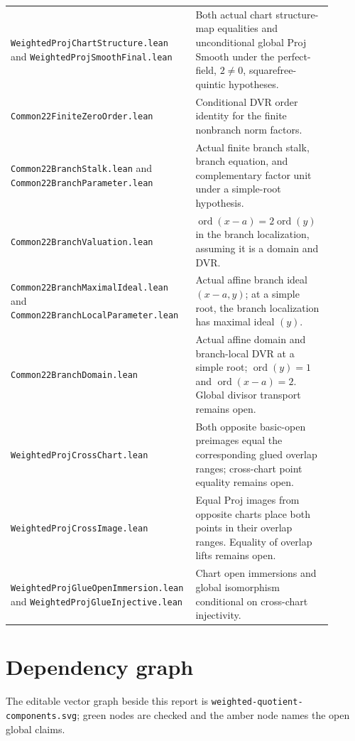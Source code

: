 \documentclass[10pt]{article}
\begin{document}
\begin{longtable}{p{0.48\linewidth}p{0.42\linewidth}}
\texttt{WeightedProjChartStructure.lean} and \texttt{WeightedProjSmoothFinal.lean} & Both actual chart structure-map equalities and unconditional global Proj Smooth under the perfect-field, $2\ne0$, squarefree-quintic hypotheses.\\
\texttt{Common22FiniteZeroOrder.lean} & Conditional DVR order identity for the finite nonbranch norm factors.\\
\texttt{Common22BranchStalk.lean} and \texttt{Common22BranchParameter.lean} & Actual finite branch stalk, branch equation, and complementary factor unit under a simple-root hypothesis.\\
\texttt{Common22BranchValuation.lean} & $\operatorname{ord}(x-a)=2\operatorname{ord}(y)$ in the branch localization, assuming it is a domain and DVR.\\
\texttt{Common22BranchMaximalIdeal.lean} and \texttt{Common22BranchLocalParameter.lean} & Actual affine branch ideal $(x-a,y)$; at a simple root, the branch localization has maximal ideal $(y)$.\\
\texttt{Common22BranchDomain.lean} & Actual affine domain and branch-local DVR at a simple root; $\operatorname{ord}(y)=1$ and $\operatorname{ord}(x-a)=2$. Global divisor transport remains open.\\
\texttt{WeightedProjCrossChart.lean} & Both opposite basic-open preimages equal the corresponding glued overlap ranges; cross-chart point equality remains open.\\
\texttt{WeightedProjCrossImage.lean} & Equal Proj images from opposite charts place both points in their overlap ranges. Equality of overlap lifts remains open.\\
\texttt{WeightedProjGlueOpenImmersion.lean} and \texttt{WeightedProjGlueInjective.lean} & Chart open immersions and global isomorphism conditional on cross-chart injectivity.\\
\bottomrule
\end{longtable}
\section*{Dependency graph}
\noindent{}\par
\noindent The editable vector graph beside this report is
\texttt{weighted-quotient-components.svg}; green nodes are checked and the
amber node names the open global claims.
\end{document}
